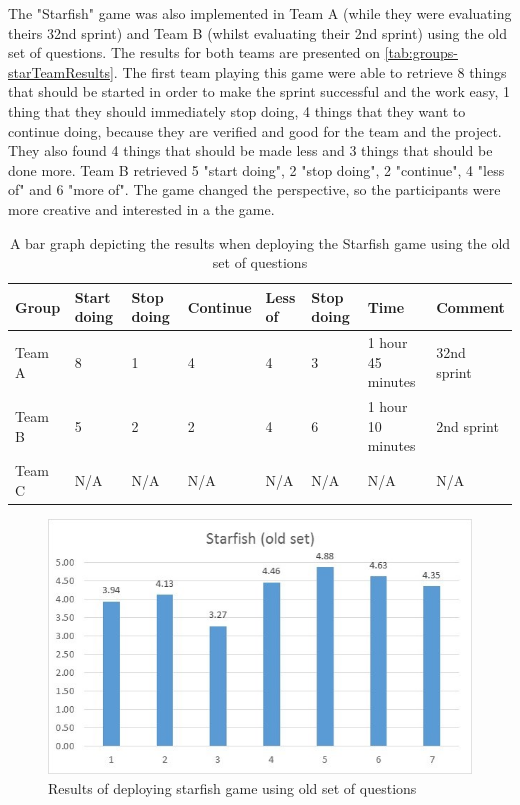 The "Starfish" game was also implemented in Team A (while they were evaluating theirs 32nd sprint) and Team B (whilst evaluating their 2nd sprint) using the old set of questions. The results for both teams are presented on \autoref{tab:groups-starTeamResults}. The first team playing this game were able to retrieve 8 things that should be started in order to make the sprint successful and the work easy, 1 thing that they should immediately stop doing, 4 things that they want to continue doing, because they are verified and good for the team and the project. They also found 4 things that should be made less and 3 things that should be done more. Team B retrieved 5 "start doing", 2 "stop doing", 2 "continue", 4 "less of" and 6 "more of". The game changed the perspective, so the participants were more creative and interested in a the game.

\begin{table}[!htbp]
	\caption{A bar graph depicting the results when deploying the Starfish game using the old set of questions}
	\label{tab:groups-starTeamResults}
	\begin{tabularx}{\textwidth}{|X|X|X|X|X|X|X|X|}
	\hline
		Group & Start doing & Stop doing & Continue & Less of &  Stop doing & Time & Comment\\ \hline
		Team A & 8 & 1 & 4 & 4 & 3 & 1 hour 45 minutes & 32nd sprint \\ \hline
		Team B & 5 & 2 & 2 & 4 & 6 & 1 hour 10 minutes & 2nd sprint \\ \hline
        Team C & N/A & N/A & N/A & N/A & N/A & N/A & N/A\\ \hline
	\end{tabularx}
\end{table}

\begin{figure}[!htbp]
\caption{Results of deploying starfish game using old set of questions}
\label{fig:starfishResultsOld}
\centering
\includegraphics[width=1\textwidth]{charts/starfishOldSet}
\end{figure}

